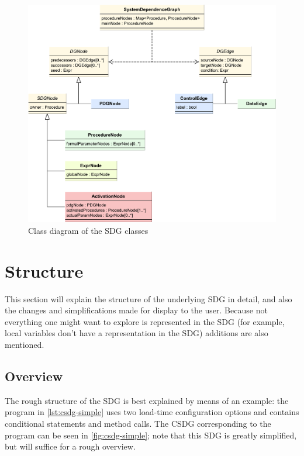 \begin{figure}[hpb]
  \centering
    \includegraphics[width=\textwidth]{bilder/sdg-class}
  \caption{Class diagram of the SDG classes}
  \label{fig:sdg-class}
\end{figure}


\section{Structure}

This section will explain the structure of the underlying SDG in detail, and also the changes and simplifications made 
for display to the user. Because not everything one might want to explore is represented in the SDG (for example, local 
variables don't have a representation in the SDG) additions are also mentioned.


\subsection{Overview}

The rough structure of the SDG is best explained by means of an example: the program in \autoref{lst:csdg-simple} uses 
two load-time configuration options and contains conditional statements and method calls. The CSDG corresponding to the 
program can be seen in \autoref{fig:csdg-simple}; note that this SDG is greatly simplified, but will suffice for a 
rough overview.

